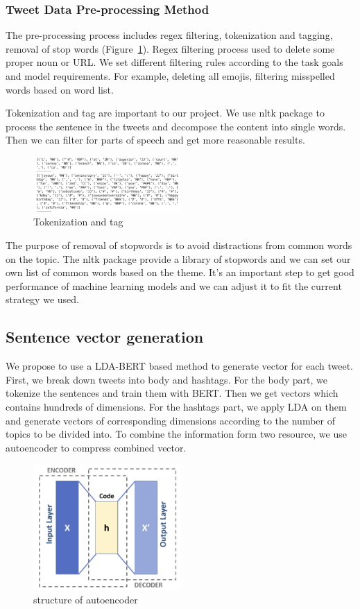 \subsubsection{Tweet Data Pre-processing Method}
The pre-processing process includes regex filtering, tokenization and tagging,
removal of stop words (Figure~\ref{fig:Tokenization and tag}). Regex
filtering process used to delete some proper noun or URL. We set different filtering rules according to the task goals and model requirements. For example, deleting all emojis, filtering misspelled words based on word list.  

Tokenization and tag are important to our project. We use nltk package to
process the sentence in the tweets and decompose the content into single
words. Then we can filter for parts of speech and get more reasonable
results. 
\begin{figure}[h]
\centering
\includegraphics[width=0.5\textwidth]{imgs/tokenization.png}
\caption{Tokenization and tag}
\label{fig:Tokenization and tag}
\end{figure}
The purpose of removal of stopwords is to avoid distractions from common words
on the topic. The nltk package provide a library of stopwords and we can set
our own list of common words based on the theme. It's an important step to
get good performance of machine learning models and we can adjust it to fit
the current strategy we used.

\subsection{Sentence vector generation}
We propose to use a LDA-BERT based method to generate vector for each tweet. First, we break down tweets into body and hashtags. For the body part, we tokenize the sentences and train them with BERT. Then we get vectors which contains hundreds of dimensions. For the hashtags part, we apply LDA on them and generate vectors of corresponding dimensions according to the number of topics to be divided into. To combine the information form two resource, we use autoencoder to compress combined vector.

\begin{figure}[h]
\centering
\includegraphics[width=0.5\textwidth]{imgs/framework/autoencoder.png}
\caption{structure of autoencoder}
\label{fig:autoencoder}
\end{figure}


